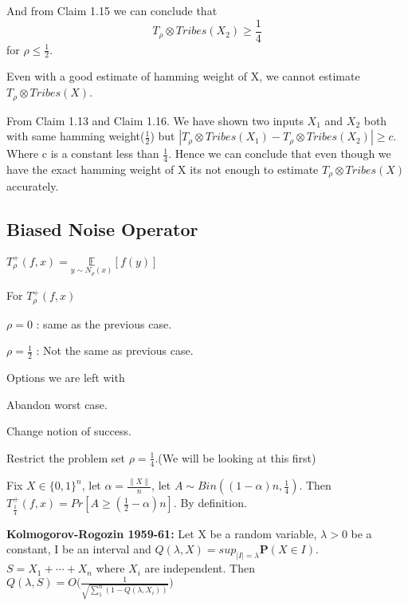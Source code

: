 \documentclass[11pt]{article}
\begin{document}
And from Claim 1.15 we can conclude that 
$$T_{\rho} \otimes Tribes(X_2) \geq \frac{1}{4}$$
for $\rho \leq \frac{1}{2}$.
\EPF

\BT
Even with a good estimate of hamming weight of X, we cannot estimate $T_{\rho} \otimes Tribes(X)$.

\ET

\BPF
From Claim 1.13 and Claim 1.16. We have shown two inputs $X_1$ and $X_2$ both with same hamming weight($\frac{1}{2}$) but  $| T_{\rho} \otimes Tribes(X_1) - T_{\rho} \otimes Tribes(X_2)| \geq c$. Where c is a constant less than $\frac{1}{4}$. Hence we can conclude that even though we have the exact hamming weight of X its not enough to estimate $T_{\rho} \otimes Tribes(X)$ accurately.

\EPF




\iffalse


\subsection{Biased Noise Operator}

\BD
$T^{+}_{\rho}(f,x)= \underset{y \sim N_{\rho}(x)}{\mathbb{E}}[f(y)]$
\ED
 
 
\noindent
For $T^{+}_{\rho}(f,x)$
\BE
 \item $\rho = 0$ : same as the previous case.
 \item $\rho = \frac{1}{2}$ : Not the same as previous case.
\EE 

\noindent
 Options we are left with
\BE
\item Abandon worst case.
\item Change notion of success.
 \item Restrict the problem set $\rho= \frac{1}{4}$.(We will be looking at this first)
\EE



 


\BCM
 Fix $X \in \{0,1\}^n$, let $\alpha = \frac{\|X\|}{n}$, let $A \sim Bin((1-\alpha)n, \frac{1}{4})$. Then $T_{\frac{1}{4}}^+ (f,x) = Pr[A \geq (\frac{1}{2} - \alpha)n]$.
\ECM
\BPF
By definition.
\EPF

\BT
\textbf{Kolmogorov-Rogozin 1959-61:} Let X be a random variable,  $\lambda>0$ be a constant, I be an interval and $Q(\lambda, X) = sup_{|I|=\lambda} \textbf{P}(X \in I)$. $S = X_1 + \cdots + X_n$ where $X_i$ are independent. Then $Q(\lambda, S) = O\Big(\frac{1}{\sqrt{\sum_{1}^{n}(1- Q(\lambda, X_i))}}\Big)$
\ET
\end{document}
